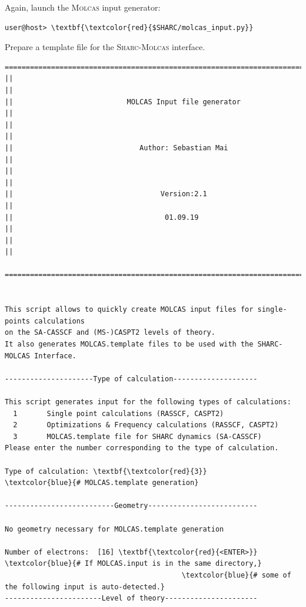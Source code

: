 \documentclass[a4paper,11pt,DIV=15,openany]{scrbook}
\newcommand{\sharc}{\textsc{Sharc}}
\begin{document}
Again, launch the \textsc{Molcas} input generator:
\begin{Verbatim}[commandchars=\\\{\}]
user@host> \textbf{\textcolor{red}{$SHARC/molcas_input.py}}
\end{Verbatim}
Prepare a template file for the \sharc-\textsc{Molcas} interface.
\begin{oframed}
\footnotesize\begin{Verbatim}[commandchars=\\\{\}]
  ================================================================================
||                                                                                ||
||                           MOLCAS Input file generator                          ||
||                                                                                ||
||                              Author: Sebastian Mai                             ||
||                                                                                ||
||                                   Version:2.1                                  ||
||                                    01.09.19                                    ||
||                                                                                ||
  ================================================================================


This script allows to quickly create MOLCAS input files for single-points calculations
on the SA-CASSCF and (MS-)CASPT2 levels of theory. 
It also generates MOLCAS.template files to be used with the SHARC-MOLCAS Interface.
  
---------------------Type of calculation--------------------

This script generates input for the following types of calculations:
  1       Single point calculations (RASSCF, CASPT2)
  2       Optimizations & Frequency calculations (RASSCF, CASPT2)
  3       MOLCAS.template file for SHARC dynamics (SA-CASSCF)
Please enter the number corresponding to the type of calculation.

Type of calculation: \textbf{\textcolor{red}{3}}        \textcolor{blue}{# MOLCAS.template generation}

--------------------------Geometry--------------------------

No geometry necessary for MOLCAS.template generation

Number of electrons:  [16] \textbf{\textcolor{red}{<ENTER>}}        \textcolor{blue}{# If MOLCAS.input is in the same directory,}
                                          \textcolor{blue}{# some of the following input is auto-detected.}
-----------------------Level of theory----------------------


\end{Verbatim}
\end{oframed}
\end{document}
